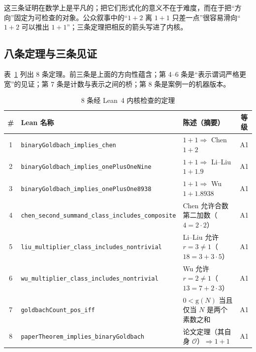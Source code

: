\documentclass[11pt,a4paper]{ctexart}
\theoremstyle{plain}
\theoremstyle{definition}
\newcommand{\g}{\mathrm{g}}
\begin{document}
这三条证明在数学上是平凡的；把它们形式化的意义不在于难度，而在于把“方向”固定为可检查的对象。公众叙事中的“$1+2$ 离 $1+1$ 只差一点”很容易滑向“$1+2$ 可以推出 $1+1$”；三条定理把相反的箭头写进了内核。

\subsection{八条定理与三条见证}
\label{sec:eight}

表~\ref{tab:eight} 列出 8 条定理。前三条是上面的方向性蕴含；第 4--6 条是“表示谓词严格更宽”的见证；第 7 条是计数与表示之间的桥；第 8 条是案例一的机器版本。

\begin{table}[htbp]
\centering
\small
\caption{8 条经 Lean~4 内核检查的定理}
\label{tab:eight}
\begin{tabularx}{\textwidth}{@{}c
>{\raggedright\arraybackslash}p{}
>{\raggedright\arraybackslash}X c@{}}
\toprule
\# & Lean 名称 & 陈述（摘要） & 等级\\
\midrule
1 & \texttt{binaryGoldbach\_implies\_}\newline\texttt{chen} & $1+1\Rightarrow$ Chen $1+2$ & A1\\
2 & \texttt{binaryGoldbach\_implies\_}\newline\texttt{onePlusOneNine} & $1+1\Rightarrow$ Li--Liu $1+1.9$ & A1\\
3 & \texttt{binaryGoldbach\_implies\_}\newline\texttt{onePlusOne8938} & $1+1\Rightarrow$ Wu $1+1.8938$ & A1\\
4 & \texttt{chen\_second\_summand\_class\_}\newline\texttt{includes\_composite} & Chen 允许合数第二加数（$4=2\cdot2$） & A1\\
5 & \texttt{liu\_multiplier\_class\_}\newline\texttt{includes\_nontrivial} & Li--Liu 允许 $r=3\ne1$（$18=3+3\cdot5$） & A1\\
6 & \texttt{wu\_multiplier\_class\_}\newline\texttt{includes\_nontrivial} & Wu 允许 $r=2\ne1$（$13=7+2\cdot3$） & A1\\
7 & \texttt{goldbachCount\_pos\_iff} & $0<\g(N)$ 当且仅当 $N$ 是两个素数之和 & A1\\
8 & \texttt{paperTheorem\_implies\_}\newline\texttt{binaryGoldbach} & 论文定理（其自身 $\mathcal O$）$\Rightarrow1+1$ & A1\\
\bottomrule
\end{tabularx}
\end{table}
\end{document}
